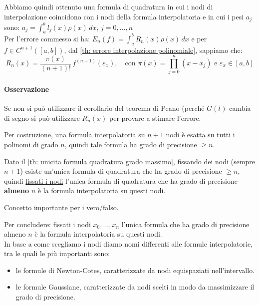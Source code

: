 \documentclass[12pt,a4paper,]{report}
\begin{document}
\medskip
\noindent
Abbiamo quindi ottenuto una formula di quadratura in cui i nodi di interpolazione coincidono con i nodi della formula interpolatoria e in cui i pesi $a_j$ sono:
$a_j = \displaystyle\int_{a}^{b} l_j(x)\rho(x)\,dx$, $j = 0,\ldots,n$\\
Per l'errore commesso si ha: $E_n(f) = \displaystyle\int_{a}^{b} R_n(x)\rho(x)\,dx$ e per $f \in C^{n+1}([a,b])$, dal \autoref{th: errore interpolazione polinomiale}, sappiamo che:
\[
R_n(x) = \frac{\pi(x)}{(n+1)!}\,f^{(n+1)}(\varepsilon_x),
\quad \text{con } \pi(x) = \prod_{j=0}^{n}(x - x_j)
\text{ e } \varepsilon_x \in [a, b]
\]
\paragraph{Osservazione}
Se non si può utilizzare il corollario del teorema di Peano (perché $G(t)$ cambia di segno si può utilizzare $R_n(x)$ per provare a stimare l'errore.

\begin{teorema}
    Per costruzione, una formula interpolatoria su $n+1$ nodi è esatta su tutti i polinomi di grado $n$, quindi tale formula ha grado di precisione $\geq n$.
\end{teorema}
\begin{teorema}
    Dato il \autoref{th: unicita formula quadratura grado massimo}, fissando dei nodi (sempre $n+1$) esiste un'unica formula di quadratura che ha grado di precisione $\ge n$, quindi \uline{fissati i nodi} l'unica formula di quadratura che ha grado di precisione \textbf{almeno} $n$ è la formula interpolatoria su questi nodi.
\end{teorema}
\begin{nota}
    Concetto importante per i vero/falso.
\end{nota}
\noindent
Per concludere: fissati i nodi $x_0, ..., x_n$ l'unica formula che ha grado di precisione almeno $n$ è la formula interpolatoria su questi nodi.\\
In base a come scegliamo i nodi diamo nomi differenti alle formule interpolatorie, tra le quali le più importanti sono:
\begin{itemize}
    \item le formule di Newton-Cotes, caratterizzate da nodi equispaziati nell'intervallo.
    \item le formule Gaussiane, caratterizzate da nodi scelti in modo da massimizzare il grado di precisione.
\end{itemize}
\end{document}
